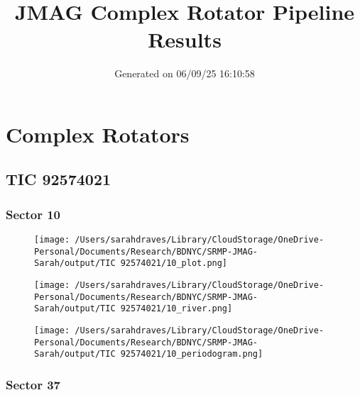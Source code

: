 \documentclass{report}%
\title{JMAG Complex Rotator Pipeline Results}%
\date{Generated on 06/09/25 16:10:58}%
\begin{document}
%
\normalsize%
\maketitle%
\tableofcontents%
\chapter{Complex Rotators}%
\label{chap:ComplexRotators}%
\newpage%
\section{TIC 92574021}%
\label{sec:TIC92574021}%
\subsection{Sector 10}%
\label{subsec:TIC9257402110}%


\begin{figure}[H]%
\begin{center}%
\centering%
\texttt{[image: /Users/sarahdraves/Library/CloudStorage/OneDrive-Personal/Documents/Research/BDNYC/SRMP-JMAG-Sarah/output/TIC 92574021/10\_plot.png]}%
\end{center}%
\end{figure}

%


\begin{figure}[H]%
\begin{center}%
\centering%
\texttt{[image: /Users/sarahdraves/Library/CloudStorage/OneDrive-Personal/Documents/Research/BDNYC/SRMP-JMAG-Sarah/output/TIC 92574021/10\_river.png]}%
\end{center}%
\end{figure}

%


\begin{figure}[H]%
\begin{center}%
\centering%
\texttt{[image: /Users/sarahdraves/Library/CloudStorage/OneDrive-Personal/Documents/Research/BDNYC/SRMP-JMAG-Sarah/output/TIC 92574021/10\_periodogram.png]}%
\end{center}%
\end{figure}

%
\newpage%
\subsection{Sector 37}%
\label{subsec:TIC9257402137}%
\end{document}

